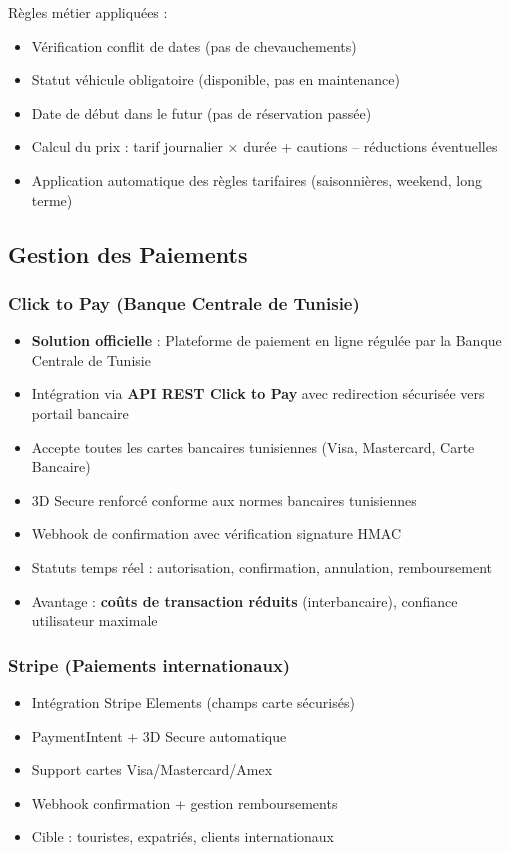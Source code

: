 \documentclass[12pt, a4paper]{article}
\begin{document}
Règles métier appliquées :
\begin{itemize}[leftmargin=*,noitemsep]
  \item Vérification conflit de dates (pas de chevauchements)
  \item Statut véhicule obligatoire (disponible, pas en maintenance)
  \item Date de début dans le futur (pas de réservation passée)
  \item Calcul du prix : tarif journalier × durée + cautions – réductions éventuelles
  \item Application automatique des règles tarifaires (saisonnières, weekend, long terme)
\end{itemize}

\subsection{Gestion des Paiements}

\subsubsection*{Click to Pay (Banque Centrale de Tunisie)}
\begin{itemize}[leftmargin=*,noitemsep]
  \item \textbf{Solution officielle} : Plateforme de paiement en ligne régulée par la Banque Centrale de Tunisie
  \item Intégration via \textbf{API REST Click to Pay} avec redirection sécurisée vers portail bancaire
  \item Accepte toutes les cartes bancaires tunisiennes (Visa, Mastercard, Carte Bancaire)
  \item 3D Secure renforcé conforme aux normes bancaires tunisiennes
  \item Webhook de confirmation avec vérification signature HMAC
  \item Statuts temps réel : autorisation, confirmation, annulation, remboursement
  \item Avantage : \textbf{coûts de transaction réduits} (interbancaire), confiance utilisateur maximale
\end{itemize}

\subsubsection*{Stripe (Paiements internationaux)}
\begin{itemize}[leftmargin=*,noitemsep]
  \item Intégration Stripe Elements (champs carte sécurisés)
  \item PaymentIntent + 3D Secure automatique
  \item Support cartes Visa/Mastercard/Amex
  \item Webhook confirmation + gestion remboursements
  \item Cible : touristes, expatriés, clients internationaux
\end{itemize}
\end{document}
